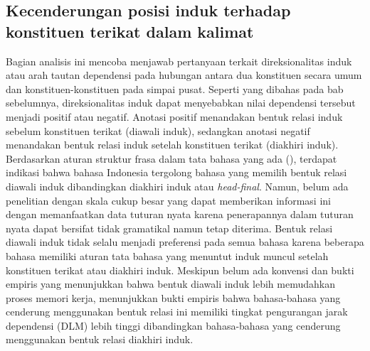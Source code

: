 \subsection{Kecenderungan posisi induk terhadap konstituen terikat dalam kalimat}

Bagian analisis ini mencoba menjawab pertanyaan terkait direksionalitas induk atau arah tautan dependensi pada hubungan antara dua konstituen secara umum dan konstituen-konstituen pada simpai pusat. Seperti yang dibahas pada bab sebelumnya, direksionalitas induk dapat menyebabkan nilai dependensi tersebut menjadi positif atau negatif. Anotasi positif menandakan bentuk relasi induk sebelum konstituen terikat (diawali induk), sedangkan anotasi negatif menandakan bentuk relasi induk setelah konstituen terikat (diakhiri induk). Berdasarkan aturan struktur frasa dalam tata bahasa yang ada (\citealp{kridalaksana2002struktur, sneddon2010indonesian}), terdapat indikasi bahwa bahasa Indonesia tergolong bahasa yang memilih bentuk relasi diawali induk dibandingkan diakhiri induk atau \textit{head-final}. Namun, belum ada penelitian dengan skala cukup besar yang dapat memberikan informasi ini dengan memanfaatkan data tuturan nyata karena penerapannya dalam tuturan nyata dapat bersifat tidak gramatikal namun tetap diterima. Bentuk relasi diawali induk tidak selalu menjadi preferensi pada semua bahasa karena beberapa bahasa memiliki aturan tata bahasa yang menuntut induk muncul setelah konstituen terikat atau diakhiri induk. Meskipun belum ada konvensi dan bukti empiris yang menunjukkan bahwa bentuk diawali induk lebih memudahkan proses memori kerja, \cite{futrell2015large} menunjukkan bukti empiris bahwa bahasa-bahasa yang cenderung menggunakan bentuk relasi ini memiliki tingkat pengurangan jarak dependensi (DLM) lebih tinggi dibandingkan bahasa-bahasa yang cenderung menggunakan bentuk relasi diakhiri induk. 

